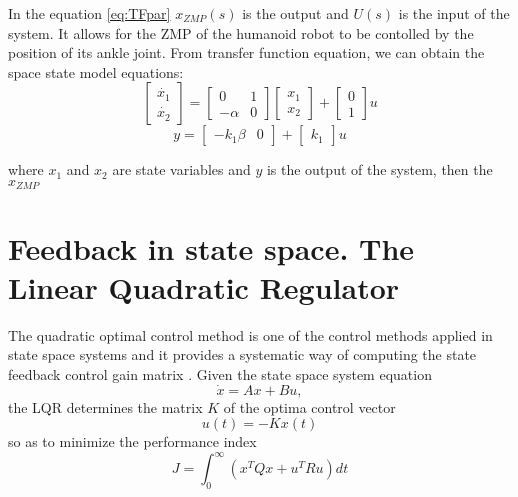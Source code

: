 In the equation \ref{eq:TFpar} $x_{ZMP}(s)$ is the output and $U(s)$ is the input of the system. It allows for the ZMP of the humanoid robot to be contolled by the position of its ankle joint. From transfer function equation, we can obtain the space state model equations:
\begin{equation}
\begin{bmatrix}
\dot{x_1} \\
\dot{x_2}
\end{bmatrix} 
= 
\begin{bmatrix}
0 & 1 \\
-\alpha & 0
\end{bmatrix}
\begin{bmatrix}
x_1 \\
x_2
\end{bmatrix}
+
\begin{bmatrix}
0 \\
1
\end{bmatrix}
u
\label{eq:state_space}
\end{equation}
\begin{equation}
y = \begin{bmatrix}
-k_1\beta & 0 
\end{bmatrix}
+ \begin{bmatrix}
k_1
\end{bmatrix}
u
\label{eq:state_space_out}
\end{equation}

where $ x_1 $ and $ x_2 $ are state variables and $y$ is the output of the system, then the $x_{ZMP}$


\section{Feedback in state space. The Linear Quadratic Regulator}

The quadratic optimal control method is one of the control methods applied in state space systems and it provides a systematic way of computing the state feedback control gain matrix \cite{Ogata}.
Given the state space system equation
\begin{equation}
\dot{x} = Ax+Bu ,
\label{eq:sseq}
\end{equation}
the LQR determines the matrix $K$ of the optima control vector
\begin{equation}
u(t) = -Kx(t)
\label{eq:control}
\end{equation}
so as to minimize the performance index
\begin{equation}
J = \int_{0}^{\infty}(x^{T}Qx+u^{T}Ru) dt
\end{equation}

